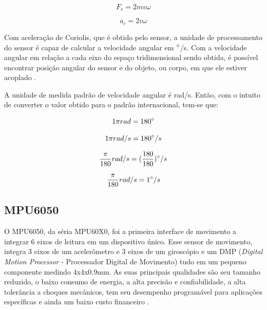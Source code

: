 			\begin{equation}
			F_{c} = 2mv\omega
			\end{equation}
			
			\begin{equation}
			a_{c} = 2v\omega
			\end{equation}
			
			Com aceleração de Coriolis, que é obtido pelo sensor, a unidade de processamento do sensor é capaz de calcular a velocidade angular em $\degree$/s. Com a velocidade angular em relação a cada eixo do espaço tridimensional sendo obtida, é possível encontrar posição angular do sensor e do objeto, ou corpo, em que ele estiver acoplado \cite{forhan2010}\cite{moyses2013}. 
			
			A unidade de medida padrão de velocidade angular  é rad/s. Então, com o intuito de converter o valor obtido para o padrão internacional, tem-se que:
			
			\begin{equation}
			1 \pi rad = 180\degree
			\end{equation}
			
			\begin{equation}
			1 \pi rad /s = 180\degree/s 
			\end{equation}
			
			\begin{equation}
			 \frac{\pi}{180} rad /s = (\frac{180}{180})\degree/s 
			\end{equation}
			
			\begin{equation}
			\frac{\pi}{180} rad /s = 1\degree/s 
			\end{equation}


\subsection{MPU6050}
	
	O MPU6050, da séria MPU60X0, foi a primeira interface de movimento a integrar 6 eixos de leitura em um dispositivo único. Esse sensor de movimento, integra 3 eixos de um acelerômetro e 3 eixos de um giroscópio e um DMP (\textit{Digital Motion Processor} - Processador Digital de Movimento) tudo em um pequeno componente medindo 4x4x0.9mm. As suas principais qualidades são seu tamanho reduzido, o baixo consumo de energia, a alta precisão e confiabilidade, a alta tolerância a choques mecânicos, tem seu desempenho programável para aplicações específicas e ainda um baixo custo financeiro \cite{mpu6050}.
	
